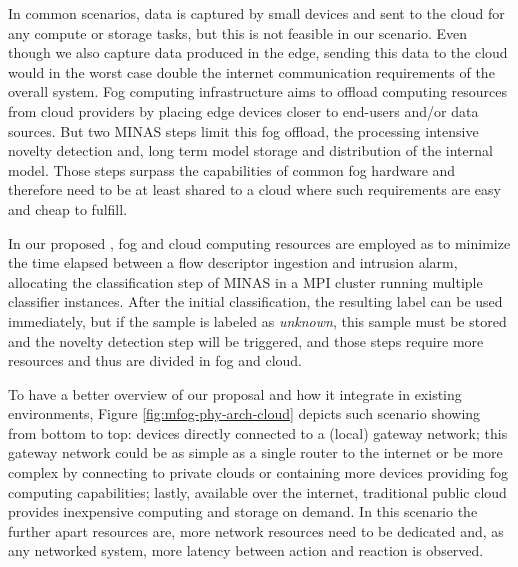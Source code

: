 
In common \iot scenarios, data is captured by small devices and sent to the
cloud for any compute or storage tasks, but this is not feasible in our
\nids scenario. Even though we also capture data produced in the edge,
sending this data to the cloud would in the worst case double the
internet communication requirements of the overall system.
Fog computing infrastructure aims to offload
computing resources from cloud providers by placing edge
devices closer to end-users and/or data sources.
But two MINAS steps limit this fog offload,
the processing intensive novelty detection and,
long term model storage and distribution of the internal model.
Those steps surpass the capabilities of common fog hardware and
therefore need to be at least shared to a cloud where such
requirements are easy and cheap to fulfill.

In our proposed \nids, fog and cloud computing resources are
employed as to minimize the time elapsed between a flow descriptor
ingestion and intrusion alarm, allocating the 
classification step of MINAS in a MPI cluster running multiple
classifier instances.
After the initial classification, the resulting label can be used immediately,
but if the sample is labeled as \emph{unknown}, this sample must be stored
and the novelty detection step will be triggered, and those steps require more resources
and thus are divided in fog and cloud.




To have a better overview of our proposal and how it integrate in existing
\iot environments, Figure \ref{fig:mfog-phy-arch-cloud} depicts such scenario
showing from bottom to top:
\iot devices directly connected to a (local) gateway network;
this gateway network could be as simple as a single router to the internet
or be more complex by connecting to private clouds or 
containing more devices providing fog computing capabilities;
lastly, available over the internet, traditional public cloud provides
inexpensive computing and storage on demand.
In this scenario the further apart resources are, more network
resources need to be dedicated and, as any networked system, more
latency between action and reaction is observed.

